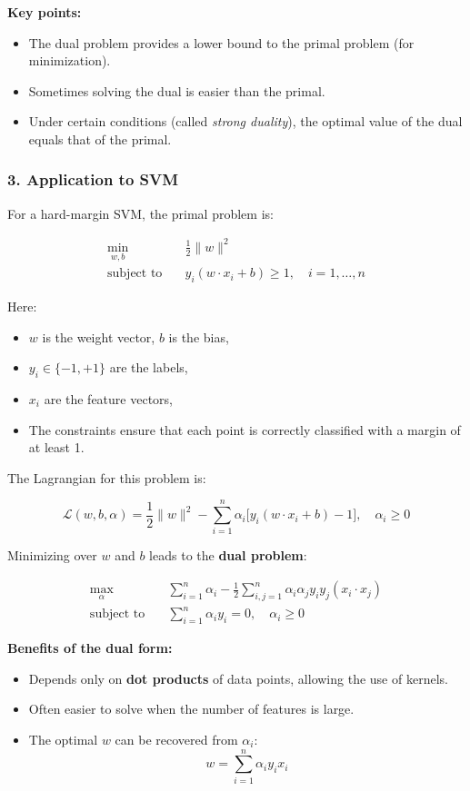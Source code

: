 \textbf{Key points:}
\begin{itemize}
    \item The dual problem provides a lower bound to the primal problem (for minimization).
    \item Sometimes solving the dual is easier than the primal.
    \item Under certain conditions (called \emph{strong duality}), the optimal value of the dual equals that of the primal.
\end{itemize}

\subsubsection*{3. Application to SVM}

For a hard-margin SVM, the primal problem is:

\[
\begin{aligned}
\min_{w,b} \quad & \frac{1}{2} \|w\|^2 \\
\text{subject to} \quad & y_i (w \cdot x_i + b) \ge 1, \quad i=1,\dots,n
\end{aligned}
\]

Here:
\begin{itemize}
    \item $w$ is the weight vector, $b$ is the bias,
    \item $y_i \in \{-1, +1\}$ are the labels,
    \item $x_i$ are the feature vectors,
    \item The constraints ensure that each point is correctly classified with a margin of at least 1.
\end{itemize}

The Lagrangian for this problem is:

\[
\mathcal{L}(w,b,\alpha) = \frac{1}{2}\|w\|^2 - \sum_{i=1}^n \alpha_i \big[y_i (w \cdot x_i + b) - 1\big], \quad \alpha_i \ge 0
\]

Minimizing over $w$ and $b$ leads to the \textbf{dual problem}:

\[
\begin{aligned}
\max_{\alpha} \quad & \sum_{i=1}^n \alpha_i - \frac{1}{2} \sum_{i,j=1}^n \alpha_i \alpha_j y_i y_j (x_i \cdot x_j) \\
\text{subject to} \quad & \sum_{i=1}^n \alpha_i y_i = 0, \quad \alpha_i \ge 0
\end{aligned}
\]

\textbf{Benefits of the dual form:}
\begin{itemize}
    \item Depends only on \textbf{dot products} of data points, allowing the use of kernels.
    \item Often easier to solve when the number of features is large.
    \item The optimal $w$ can be recovered from $\alpha_i$:
    \[
        w = \sum_{i=1}^n \alpha_i y_i x_i
    \]
\end{itemize}

